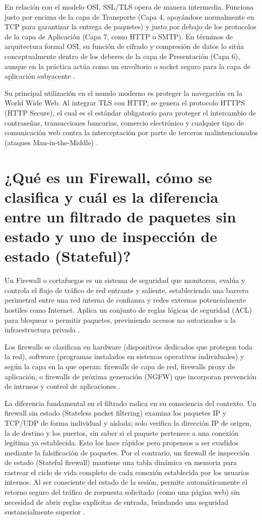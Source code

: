 \documentclass[a4paper,12pt]{article}
\begin{document}
En relación con el modelo OSI, SSL/TLS opera de manera intermedia. Funciona justo por encima de la capa de Transporte (Capa 4, apoyándose normalmente en TCP para garantizar la entrega de paquetes) y justo por debajo de los protocolos de la capa de Aplicación (Capa 7, como HTTP o SMTP). En términos de arquitectura formal OSI, su función de cifrado y compresión de datos lo sitúa conceptualmente dentro de los deberes de la capa de Presentación (Capa 6), aunque en la práctica actúa como un envoltorio o socket seguro para la capa de aplicación subyacente \cite{forouzan2015}.

Su principal utilización en el mundo moderno es proteger la navegación en la World Wide Web. Al integrar TLS con HTTP, se genera el protocolo HTTPS (HTTP Secure), el cual es el estándar obligatorio para proteger el intercambio de contraseñas, transacciones bancarias, comercio electrónico y cualquier tipo de comunicación web contra la interceptación por parte de terceros malintencionados (ataques Man-in-the-Middle) \cite{ibm2023}.

\section{¿Qué es un Firewall, cómo se clasifica y cuál es la diferencia entre un filtrado de paquetes sin estado y uno de inspección de estado (Stateful)?}

Un Firewall o cortafuegos es un sistema de seguridad que monitorea, evalúa y controla el flujo de tráfico de red entrante y saliente, estableciendo una barrera perimetral entre una red interna de confianza y redes externas potencialmente hostiles como Internet. Aplica un conjunto de reglas lógicas de seguridad (ACL) para bloquear o permitir paquetes, previniendo accesos no autorizados a la infraestructura privada \cite{kurose2017}.

Los firewalls se clasifican en hardware (dispositivos dedicados que protegen toda la red), software (programas instalados en sistemas operativos individuales) y según la capa en la que operan: firewalls de capa de red, firewalls proxy de aplicación, o firewalls de próxima generación (NGFW) que incorporan prevención de intrusos y control de aplicaciones \cite{fortinet2023}.

La diferencia fundamental en el filtrado radica en su consciencia del contexto. Un firewall sin estado (Stateless packet filtering) examina los paquetes IP y TCP/UDP de forma individual y aislada; solo verifica la dirección IP de origen, la de destino y los puertos, sin saber si el paquete pertenece a una conexión legítima ya establecida. Esto los hace rápidos pero propensos a ser evadidos mediante la falsificación de paquetes. Por el contrario, un firewall de inspección de estado (Stateful firewall) mantiene una tabla dinámica en memoria para rastrear el ciclo de vida completo de cada conexión establecida por los usuarios internos. Al ser consciente del estado de la sesión, permite automáticamente el retorno seguro del tráfico de respuesta solicitado (como una página web) sin necesidad de abrir reglas explícitas de entrada, brindando una seguridad sustancialmente superior \cite{stallings2017}.
\end{document}
